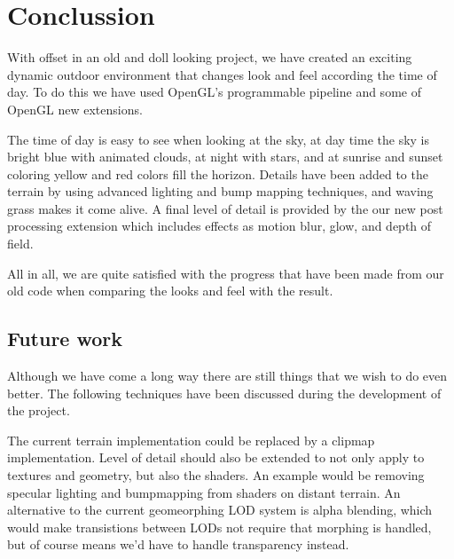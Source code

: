 
\chapter{Conclussion}
With offset in an old and doll looking project, we have created an
exciting dynamic outdoor environment that changes look and feel
according the time of day. To do this we have used OpenGL's
programmable pipeline and some of OpenGL new extensions.

The time of day is easy to see when looking at the sky, at day time
the sky is bright blue with animated clouds, at night with stars, and
at sunrise and sunset coloring yellow and red colors fill the horizon.
%
Details have been added to the terrain by using advanced lighting and
bump mapping techniques, and waving grass makes it come alive.
%
A final level of detail is provided by the our new post processing
extension which includes effects as motion blur, glow, and depth of
field.

All in all, we are quite satisfied with the progress that have been
made from our old code when comparing the looks and feel with the
result.







\section{Future work}
Although we have come a long way there are still things that we wish to
do even better. The following techniques have been discussed during
the development of the project.

The current terrain implementation could be replaced by a clipmap
implementation. Level of detail should also be extended to not only
apply to textures and geometry, but also the shaders. An example would
be removing specular lighting and bumpmapping from shaders on distant
terrain. An alternative to the current geomeorphing LOD system is
alpha blending, which would make transistions between LODs not require
that morphing is handled, but of course means we'd have to handle
transparency instead.


